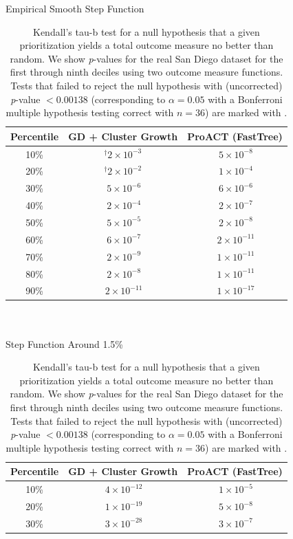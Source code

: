 \begin{table}[!ht] %
\caption[Kendall's Tau-b Test \textit{p}-Values (Step Functions)]{Kendall's tau-b test for a null hypothesis that a given prioritization yields a total outcome measure no better than random. We show \textit{p}-values for the real San Diego dataset for the first through ninth deciles using two outcome measure functions. Tests that failed to reject the null hypothesis with (uncorrected) \textit{p}-value $< 0.00138$ (corresponding to $\alpha=0.05$ with a Bonferroni multiple hypothesis testing correct with $n=36$) are marked with \dag.}
\vspace{-0.25in}
\begin{center}
Empirical Smooth Step Function\\
\begin{tabular}{|c|c|c|}
\hline
\textbf{Percentile} & \textbf{GD + Cluster Growth} & \textbf{ProACT (FastTree)}\\
\hline
10\% & $^\dag2\times10^{-3}$ & $^{\ }5\times10^{-8}$\\
\hline
20\% & $^\dag2\times10^{-2}$ & $^{\ }1\times10^{-4}$\\
\hline
30\% & $^{\ }5\times10^{-6}$ & $^{\ }6\times10^{-6}$\\
\hline
40\% & $^{\ }2\times10^{-4}$ & $^{\ }2\times10^{-7}$\\
\hline
50\% & $^{\ }5\times10^{-5}$ & $^{\ }2\times10^{-8}$\\
\hline
60\% & $^{\ }6\times10^{-7}$ & $^{\ }2\times10^{-11}$\\
\hline
70\% & $^{\ }2\times10^{-9}$ & $^{\ }1\times10^{-11}$\\
\hline
80\% & $^{\ }2\times10^{-8}$ & $^{\ }1\times10^{-11}$\\
\hline
90\% & $^{\ }2\times10^{-11}$ & $^{\ }1\times10^{-17}$\\
\hline
\end{tabular}
~\\~\\
Step Function Around 1.5\%\\
\begin{tabular}{|c|c|c|}
\hline
\textbf{Percentile} & \textbf{GD + Cluster Growth} & \textbf{ProACT (FastTree)}\\
\hline
10\% & $^{\ }4\times10^{-12}$ & $^{\ }1\times10^{-5}$\\
\hline
20\% & $^{\ }1\times10^{-19}$ & $^{\ }5\times10^{-8}$\\
\hline
30\% & $^{\ }3\times10^{-28}$ & $^{\ }3\times10^{-7}$\\

\end{tabular}
\end{center}
\end{table}
